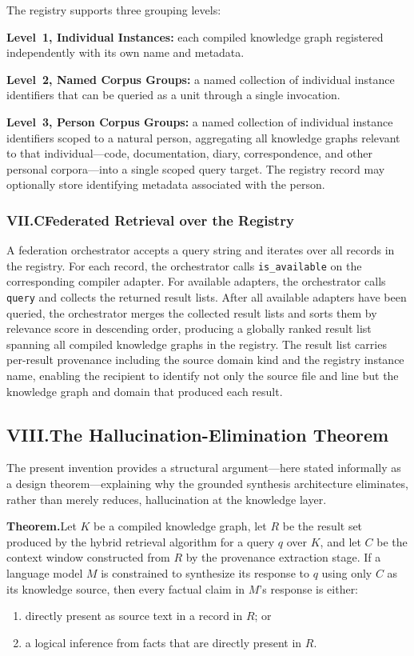 \documentclass[12pt]{article}
\begin{document}
The registry supports three grouping levels:

\textbf{Level~1, Individual Instances:} each compiled knowledge graph registered
independently with its own name and metadata.

\textbf{Level~2, Named Corpus Groups:} a named collection of individual instance
identifiers that can be queried as a unit through a single invocation.

\textbf{Level~3, Person Corpus Groups:} a named collection of individual instance
identifiers scoped to a natural person, aggregating all knowledge graphs relevant
to that individual---code, documentation, diary, correspondence, and other
personal corpora---into a single scoped query target. The registry record may
optionally store identifying metadata associated with the person.

\subsubsection{VII.C\quad Federated Retrieval over the Registry}

A federation orchestrator accepts a query string and iterates over all records in
the registry. For each record, the orchestrator calls \texttt{is\_available} on
the corresponding compiler adapter. For available adapters, the orchestrator
calls \texttt{query} and collects the returned result lists. After all available
adapters have been queried, the orchestrator merges the collected result lists and
sorts them by relevance score in descending order, producing a globally ranked
result list spanning all compiled knowledge graphs in the registry. The result
list carries per-result provenance including the source domain kind and the
registry instance name, enabling the recipient to identify not only the source
file and line but the knowledge graph and domain that produced each result.

\subsection{VIII.\quad The Hallucination-Elimination Theorem}

The present invention provides a structural argument---here stated informally as
a design theorem---explaining why the grounded synthesis architecture eliminates,
rather than merely reduces, hallucination at the knowledge layer.

\bigskip
\noindent\textbf{Theorem.}\quad Let $K$ be a compiled knowledge graph, let $R$ be
the result set produced by the hybrid retrieval algorithm for a query $q$ over
$K$, and let $C$ be the context window constructed from $R$ by the provenance
extraction stage. If a language model $M$ is constrained to synthesize its
response to $q$ using only $C$ as its knowledge source, then every factual claim
in $M$'s response is either:
\begin{enumerate}[label=(\alph*), leftmargin=2em]
  \item directly present as source text in a record in $R$; or
  \item a logical inference from facts that are directly present in $R$.
\end{enumerate}
\end{document}
